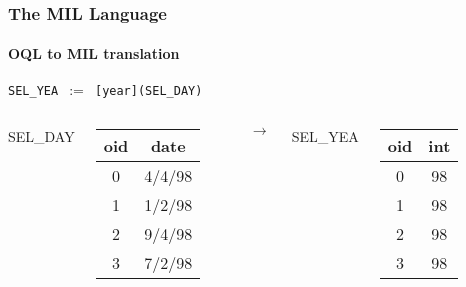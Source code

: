 \documentclass{beamer}
\begin{document}
\begin{frame}
  \frametitle{The MIL Language}
  \framesubtitle{OQL to MIL translation}

  \begin{block}{}
  {\tt SEL\_YEA $:=$ [year](SEL\_DAY)}
  \end{block}

  \begin{columns}

  \column{1cm}

  SEL\_DAY
  \begin{tabular}{|c|c|}
    \hline
    oid & date \\
    \hline
    0 & 4/4/98 \\
    1 & 1/2/98 \\
    2 & 9/4/98 \\
    3 & 7/2/98 \\
    \hline
  \end{tabular}

  \column{1cm}

  $\longrightarrow$

  \column{1cm}

  SEL\_YEA
  \begin{tabular}{|c|c|}
    \hline
    oid & int \\
    \hline
    0 & 98 \\
    1 & 98 \\
    2 & 98 \\
    3 & 98 \\
    \hline
  \end{tabular}

  \end{columns}

\end{frame}
\end{document}

